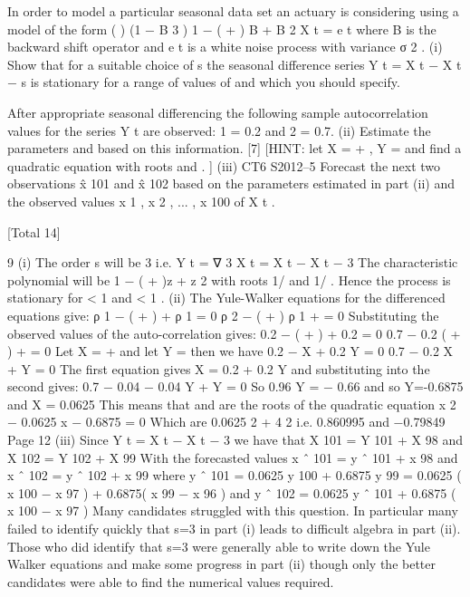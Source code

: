 \documentclass[a4paper,12pt]{article}
\begin{document}
In order to model a particular seasonal data set an actuary is considering using a
model of the form
(
)
(1 − B 3 ) 1 − ( \alpha  + \beta  ) B + \alpha \beta  B 2 X t = e t
where B is the backward shift operator and e t is a white noise process with variance
σ 2 .
(i)
Show that for a suitable choice of s the seasonal difference series
Y t = X t − X t − s is stationary for a range of values of \alpha  and \beta  which you should
specify.

After appropriate seasonal differencing the following sample autocorrelation values
for the series Y t are observed: \hat{\rho} 1 = 0.2 and \hat{\rho} 2 = 0.7.
(ii)
Estimate the parameters \alpha  and \beta  based on this information.
[7]
[HINT: let X = \alpha  + \beta , Y = \alpha \beta  and find a quadratic equation with roots
\alpha  and \beta . ]
(iii)
CT6 S2012–5
Forecast the next two observations x̂ 101 and x̂ 102 based on the parameters
estimated in part (ii) and the observed values x 1 , x 2 , ... , x 100 of X t .

[Total 14]



9
(i)
The order s will be 3 i.e. Y t = ∇ 3 X t = X t − X t − 3
The characteristic polynomial will be 1 − ( \alpha  + \beta  )z + \alpha \beta  z 2 with roots 1/ \alpha  and
1/ \beta  .
Hence the process is stationary for \alpha  < 1 and \beta  < 1 .
(ii)
The Yule-Walker equations for the differenced equations give:
ρ 1 − ( \alpha  + \beta  ) + \alpha \beta ρ 1 = 0
ρ 2 − ( \alpha  + \beta  ) ρ 1 + \alpha \beta  = 0
Substituting the observed values of the auto-correlation gives:
0.2 − ( \alpha  + \beta  ) + 0.2 \alpha \beta  = 0
0.7 − 0.2 ( \alpha  + \beta  ) + \alpha \beta  = 0
Let X = \alpha  + \beta  and let Y = \alpha \beta  then we have
0.2 − X + 0.2 Y = 0
0.7 − 0.2 X + Y = 0
The first equation gives X = 0.2 + 0.2 Y and substituting into the second gives:
0.7 − 0.04 − 0.04 Y + Y = 0
So 0.96 Y = − 0.66 and so Y=-0.6875 and X = 0.0625
This means that \alpha  and \beta  are the roots of the quadratic equation
x 2 − 0.0625 x − 0.6875 = 0
Which are
0.0625  2 + 4 
2
i.e. 0.860995 and −0.79849
Page 12
(iii)
Since Y t = X t − X t − 3 we have that
X 101 = Y 101 + X 98
and
X 102 = Y 102 + X 99
With the forecasted values
x ˆ 101 = y ˆ 101 + x 98
and
x ˆ 102 = y ˆ 102 + x 99
where
y ˆ 101 = 0.0625 y 100 + 0.6875 y 99 = 0.0625 ( x 100 − x 97 ) + 0.6875( x 99 − x 96 )
and
y ˆ 102 = 0.0625 y ˆ 101 + 0.6875 ( x 100 − x 97 )
Many candidates struggled with this question. In particular many failed to identify quickly
that s=3 in part (i) leads to difficult algebra in part (ii). Those who did identify that s=3
were generally able to write down the Yule Walker equations and make some progress in part
(ii) though only the better candidates were able to find the numerical values required.
\end{document}
